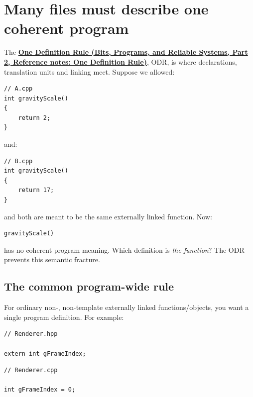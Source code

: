 \section{Many files must describe one coherent program}\label{05-engine-i-ch002-many-files-must-describe-one-coherent-program}

\hypertarget{05-engine-i-ch002-many-files-must-describe-one-coherent-program}{}

The \textbf{\href{../01-Bits-Programs-and-Reliable-Systems-P02/main.pdf\#nameddest=appendix-49d27bc9d9a5}{One Definition Rule (Bits, Programs, and Reliable Systems, Part 2, Reference notes: One Definition Rule)}}, ODR, is where declarations, translation units and linking meet. Suppose we allowed:

\begin{verbatim}
// A.cpp
int gravityScale()
{
    return 2;
}
\end{verbatim}

and:

\begin{verbatim}
// B.cpp
int gravityScale()
{
    return 17;
}
\end{verbatim}

and both are meant to be the same externally linked function. Now:

\begin{verbatim}
gravityScale()
\end{verbatim}

has no coherent program meaning. Which definition is \emph{the function}? The ODR prevents this semantic fracture.

\subsection{The common program-wide rule}\label{05-engine-i-ch002-the-common-program-wide-rule}

\hypertarget{05-engine-i-ch002-the-common-program-wide-rule}{}

For ordinary non-, non-template externally linked functions/objects, you want a single program definition. For example:

\begin{verbatim}
// Renderer.hpp

extern int gFrameIndex;
\end{verbatim}

\begin{verbatim}
// Renderer.cpp

int gFrameIndex = 0;
\end{verbatim}

